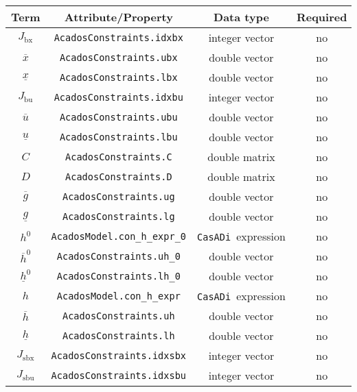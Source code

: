 \documentclass[english]{article}
\newcommand{\code}[1]{\texttt{#1}}
\newcommand{\casadi}{\texttt{CasADi}}
\newcommand{\ind}[1]{_{\textrm{#1}}}
\newcommand{\initial}{^{\textrm{0}}}
\newcommand{\optional}{no}
\begin{document}
\begin{table}[ht!]
    \centering
    \begin{tabular}{cccc}
        \toprule
        Term & Attribute/Property & Data type & Required \\ \midrule
        $J\ind{bx}$ & \code{AcadosConstraints.idxbx}    & integer vector & \optional  \\
        $\overline{x} $  & \code{AcadosConstraints.ubx}     & double vector  & \optional   \\
        $\underline{x} $    & \code{AcadosConstraints.lbx}     & double vector  & \optional  \\[1em]
        $J\ind{bu}$ & \code{AcadosConstraints.idxbu}    & integer vector   & \optional    \\
        $\overline{u} $         & \code{AcadosConstraints.ubu}     & double vector  & \optional   \\
        $\underline{u} $    & \code{AcadosConstraints.lbu}     & double vector   & \optional   \\ [1em]
        $C$ & \code{AcadosConstraints.C}    & double matrix & \optional \\
        $D $    & \code{AcadosConstraints.D}     & double matrix & \optional \\
        $\overline{g} $         & \code{AcadosConstraints.ug}     & double  vector & \optional   \\
        $\underline{g} $    & \code{AcadosConstraints.lg}     & double  vector & \optional    \\ [1em]
        $ h\initial $ & \code{AcadosModel.con\_h\_expr\_0}    & \casadi~expression  & \optional   \\
        $\overline{h}\initial $         & \code{AcadosConstraints.uh\_0}     & double  vector & \optional   \\
        $\underline{h}\initial $    & \code{AcadosConstraints.lh\_0}     & double  vector  & \optional   \\ [1em]
        $ h $ & \code{AcadosModel.con\_h\_expr}    & \casadi~expression  & \optional   \\
        $\overline{h} $         & \code{AcadosConstraints.uh}     & double  vector & \optional   \\
        $\underline{h} $    & \code{AcadosConstraints.lh}     & double  vector  & \optional   \\ [1em]
        $ J\ind{sbx} $ & \code{AcadosConstraints.idxsbx} & integer vector& \optional  \\
        $ J\ind{sbu}$ & \code{AcadosConstraints.idxsbu} & integer  vector& \optional \\

\end{tabular}
\end{table}
\end{document}

